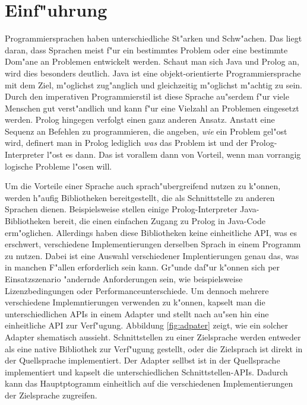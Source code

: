
\section{Einf"uhrung}
Programmiersprachen haben unterschiedliche St"arken und Schw"achen. Das liegt daran, dass Sprachen meist f"ur ein bestimmtes Problem oder eine bestimmte Dom"ane an Problemen entwickelt werden. Schaut man sich Java und Prolog an, wird dies besonders deutlich. Java ist eine objekt-orientierte Programmiersprache mit dem Ziel, m"oglichst zug"anglich und gleichzeitig m"oglichst m"achtig zu sein. Durch den imperativen Programmierstil ist diese Sprache au"serdem f"ur viele Menschen gut verst"andlich und kann f"ur eine Vielzahl an Problemen eingesetzt werden. Prolog hingegen verfolgt einen ganz anderen Ansatz. Anstatt eine Sequenz an Befehlen zu programmieren, die angeben, \textit{wie} ein Problem gel"ost wird, definert man in Prolog lediglich \textit{was} das Problem ist und der Prolog-Interpreter l"ost es dann. Das ist vorallem dann von Vorteil, wenn man vorrangig logische Probleme l"osen will.

Um die Vorteile einer Sprache auch sprach"ubergreifend nutzen zu k"onnen, werden h"aufig Bibliotheken bereitgestellt, die als Schnittstelle zu anderen Sprachen dienen. Beispielsweise stellen einige Prolog-Interpreter Java-Bibliotheken bereit, die einen einfachen Zugang zu Prolog in Java-Code erm"oglichen. Allerdings haben diese Bibliotheken keine einheitliche API, was es erschwert, verschiedene Implementierungen derselben Sprach in einem Programm zu nutzen. Dabei ist eine Auswahl verschiedener Implentierungen genau das, was in manchen F"allen erforderlich sein kann. Gr"unde daf"ur k"onnen sich per Einsatzszenario "andernde Anforderungen sein, wie beispielsweise Lizenzbedingungen oder Performanceunterschiede. Um dennoch mehrere verschiedene Implemntierungen verwenden zu k"onnen, kapselt man die unterschiedlichen APIs in einem Adapter und stellt nach au"sen hin eine einheitliche API zur Verf"ugung. Abbildung \ref{fig:adpater} zeigt, wie ein solcher Adapter shematisch aussieht. Schnittstellen zu einer Zielsprache werden entweder als eine native Bibliothek zur Verf"ugung gestellt, oder die Zielsprach ist direkt in der Quellsprache implementiert. Der Adapter sellbst ist in der Quellsprache implementiert und kapselt die unterschiedlichen Schnittstellen-APIs. Dadurch kann das Hauptptogramm einheitlich auf die verschiedenen Implementierungen der Zielsprache zugreifen.

